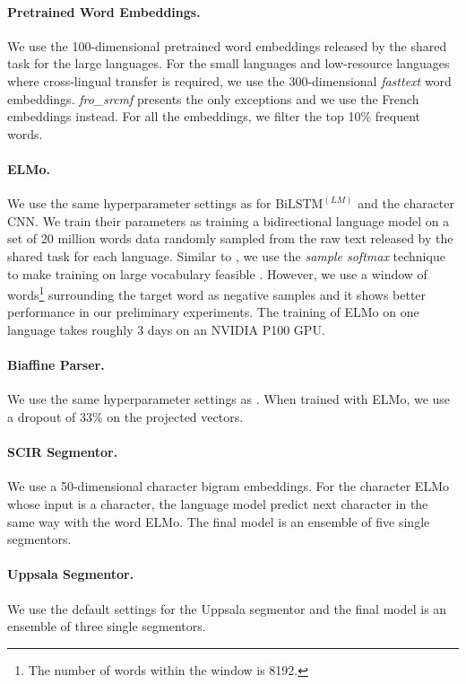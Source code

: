 \documentclass[11pt,a4paper]{article}
\begin{document}
\paragraph{Pretrained Word Embeddings.}
We use the 100-dimensional pretrained word embeddings released by the shared task
for the large languages.
For the small languages and low-resource languages where cross-lingual transfer is required,
we use the 300-dimensional \textit{fasttext} word embeddings.
\textit{fro\_srcmf} presents the only exceptions and we use the French embeddings instead.
For all the embeddings, we filter the top 10\% frequent words.

\paragraph{ELMo.}
We use the same hyperparameter settings as \citet{N18-1202} for $\text{BiLSTM}^{(LM)}$
and the character CNN.
We train their parameters
as training a bidirectional language model
on a set of 20 million words data randomly
sampled from the raw text released by the shared task for each language.
Similar to \citet{N18-1202}, we use the \textit{sample softmax} technique
to make training on large vocabulary feasible \cite{jean-EtAl:2015:ACL-IJCNLP}.
However, we use a window of words\footnote{The number of words within the window is 8192.} surrounding the target word
as negative samples and it shows better performance in our preliminary experiments.
The training of ELMo on one language takes roughly 3 days on an NVIDIA P100 GPU.

\paragraph{Biaffine Parser.}
We use the same hyperparameter settings
as \citet{dozat-qi-manning:2017:K17-3}.
When trained with ELMo, we use a dropout of 33\% on the projected vectors.

\paragraph{SCIR Segmentor.}
We use a
50-dimensional character bigram embeddings.
For the character ELMo whose input is a character,
the language model predict next character  in the same way with the word ELMo.
The final model is an ensemble of five single segmentors.

\paragraph{Uppsala Segmentor.}
We use the default settings for the Uppsala segmentor and the
final model is an ensemble of three single segmentors.
\end{document}
